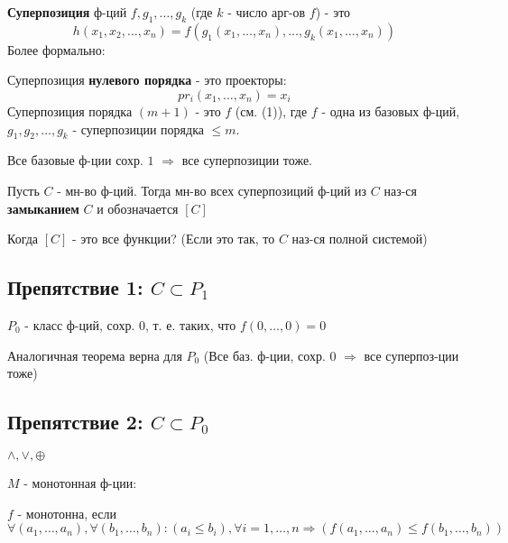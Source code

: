 \begin{definition}
\textbf{Суперпозиция} ф-ций $f, g_1, \ldots, g_k$ (где $k$ - число арг-ов $f$) - это
\begin{equation}
  h(x_1, x_2, \ldots , x_n) = f(g_1(x_1, \ldots, x_n), \ldots, g_k(x_1, \ldots, x_n))
\end{equation}
Более формально:

Суперпозиция \textbf{нулевого порядка} - это проекторы:
\[
pr_{i}(x_1, \ldots, x_n) = x_i
\] 
Суперпозиция порядка $(m + 1)$ - это $f$ (см. (1)), где $f$ - одна из базовых ф-ций, $g_1, g_2, \ldots , g_k$ - суперпозиции порядка $\leq m$.
\end{definition}
\begin{theorem}
Все базовые ф-ции сохр. $1$ $\Rightarrow$ все суперпозиции тоже.
\end{theorem}

\begin{definition}
Пусть $C$ - мн-во ф-ций. Тогда мн-во всех суперпозиций ф-ций из $C$ наз-ся \textbf{замыканием }$C$ и обозначается $[C]$
\end{definition}

Когда $[C]$ - это все функции? (Если это так, то $C$ наз-ся полной системой)

\subsection{Препятствие 1: $C \subset P_1$}

\begin{definition}
$P_0$ - класс ф-ций, сохр. 0, т. е. таких, что $f(0, \ldots, 0) = 0$

Аналогичная теорема верна для $P_0$ (Все баз. ф-ции, сохр. 0 $\Rightarrow$ все суперпоз-ции тоже)
\end{definition}
\subsection{Препятствие 2: $C \subset P_0$}
\begin{example}
 $\land, \lor, \oplus $
\end{example}

\begin{definition}
$M$ - монотонная ф-ции:

$f$ - монотонна, если $\forall (a_1, \ldots, a_n), \forall (b_1, \ldots, b_n) \colon (a_i \leq b_i), \forall i=1,\ldots,n \Rightarrow (f(a_1, \ldots, a_n) \leq f(b_1, \ldots, b_n))$
\end{definition}

